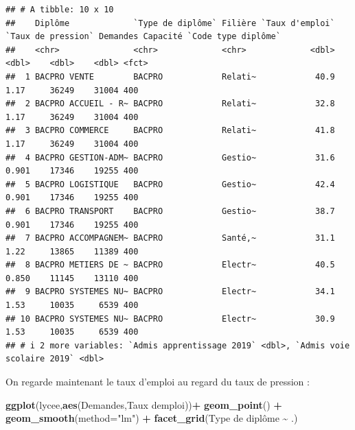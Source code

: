 \documentclass[
]{book}
\newenvironment{Shaded}{\begin{snugshade}}{\end{snugshade}}
\newcommand{\AttributeTok}[1]{\textcolor[rgb]{0.13,0.29,0.53}{#1}}
\newcommand{\FunctionTok}[1]{\textcolor[rgb]{0.13,0.29,0.53}{\textbf{#1}}}
\newcommand{\NormalTok}[1]{#1}
\newcommand{\SpecialCharTok}[1]{\textcolor[rgb]{0.81,0.36,0.00}{\textbf{#1}}}
\newcommand{\StringTok}[1]{\textcolor[rgb]{0.31,0.60,0.02}{#1}}
\begin{document}
\begin{verbatim}
## # A tibble: 10 x 10
##    Diplôme             `Type de diplôme` Filière `Taux d'emploi` `Taux de pression` Demandes Capacité `Code type diplôme`
##    <chr>               <chr>             <chr>             <dbl>              <dbl>    <dbl>    <dbl> <fct>              
##  1 BACPRO VENTE        BACPRO            Relati~            40.9              1.17     36249    31004 400                
##  2 BACPRO ACCUEIL - R~ BACPRO            Relati~            32.8              1.17     36249    31004 400                
##  3 BACPRO COMMERCE     BACPRO            Relati~            41.8              1.17     36249    31004 400                
##  4 BACPRO GESTION-ADM~ BACPRO            Gestio~            31.6              0.901    17346    19255 400                
##  5 BACPRO LOGISTIQUE   BACPRO            Gestio~            42.4              0.901    17346    19255 400                
##  6 BACPRO TRANSPORT    BACPRO            Gestio~            38.7              0.901    17346    19255 400                
##  7 BACPRO ACCOMPAGNEM~ BACPRO            Santé,~            31.1              1.22     13865    11389 400                
##  8 BACPRO METIERS DE ~ BACPRO            Electr~            40.5              0.850    11145    13110 400                
##  9 BACPRO SYSTEMES NU~ BACPRO            Electr~            34.1              1.53     10035     6539 400                
## 10 BACPRO SYSTEMES NU~ BACPRO            Electr~            30.9              1.53     10035     6539 400                
## # i 2 more variables: `Admis apprentissage 2019` <dbl>, `Admis voie scolaire 2019` <dbl>
\end{verbatim}

On regarde maintenant le taux d'emploi au regard du taux de pression :

\begin{Shaded}
\begin{Highlighting}[]
\FunctionTok{ggplot}\NormalTok{(lycee,}\FunctionTok{aes}\NormalTok{(Demandes,}\StringTok{\textasciigrave{}}\AttributeTok{Taux d\textquotesingle{}emploi}\StringTok{\textasciigrave{}}\NormalTok{))}\SpecialCharTok{+}
  \FunctionTok{geom\_point}\NormalTok{() }\SpecialCharTok{+} \FunctionTok{geom\_smooth}\NormalTok{(}\AttributeTok{method=}\StringTok{"lm"}\NormalTok{) }\SpecialCharTok{+} \FunctionTok{facet\_grid}\NormalTok{(}\StringTok{\textasciigrave{}}\AttributeTok{Type de diplôme}\StringTok{\textasciigrave{}} \SpecialCharTok{\textasciitilde{}}\NormalTok{ .) }
\end{Highlighting}
\end{Shaded}
\end{document}
